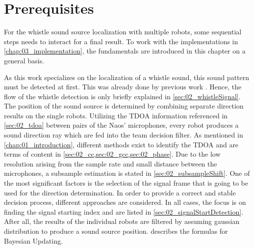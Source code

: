 \chapter{Prerequisites}
\label{chap:02_prerequisites}

For the whistle sound source localization with multiple robots, some
sequential steps needs to interact for a final result.
To work with the implementations in \cref{chap:03_implementation}, the fundamentals
are introduced in this chapter on a general basis.

As this work specializes on the localization of a whistle sound, this sound pattern
must be detected at first.
This was already done by previous work \cite{Hasselbring}.
Hence, the flow of the whistle detection is only briefly explained in \cref{sec:02_whistleSignal}.
The position of the sound source is determined by combining
separate direction results on the single robots.
Utilizing the \ac{TDOA} information referenced in \cref{sec:02_tdoa} between pairs
of the Naos' microphones, every robot produces a sound direction ray which
are fed into the team decision filter.
As mentioned in \cref{chap:01_introduction}, different methods exist to identify the \ac{TDOA}
and are terms of content in \cref{sec:02_cc,sec:02_gcc,sec:02_phase}.
Due to the low resolution arising from the sample rate and small distance between the microphones,
a subsample estimation is stated in \cref{sec:02_subsampleShift}.
One of the most significant factors is the selection of the signal frame that is going to
be used for the direction determination.
In order to provide a correct and stable decision process, different approaches
are considered.
In all cases, the focus is on finding the signal starting index
and are listed in \cref{sec:02_signalStartDetection}.
After all, the results of the individual robots are filtered by assuming
gaussian distribution to produce a sound source position.
 describes the formulas for Bayesian Updating.









% 

